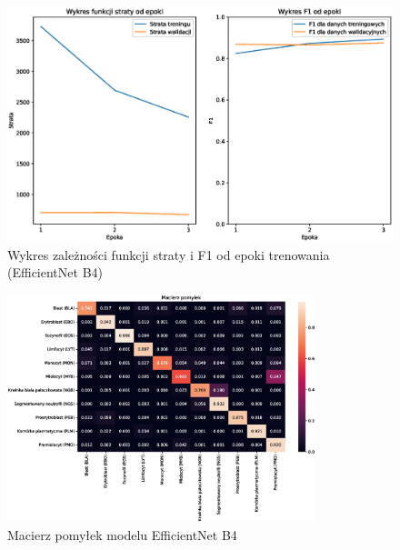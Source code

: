 \begin{figure}
    \centering
    \includegraphics[width=\textwidth]{experiments/efficientnet_b4/combined}
    \caption{Wykres zależności funkcji straty i F1 od epoki trenowania (EfficientNet B4)}
    \label{fig:plot_efficientnet_b4}
\end{figure}
\begin{figure}
    \centering
    \includegraphics[width=0.8\textwidth]{experiments/efficientnet_b4/confusion_matrix}
    \caption{Macierz pomyłek modelu EfficientNet B4}
    \label{fig:confusion_efficientnet_b4}
\end{figure}

